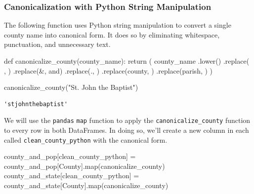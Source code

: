\documentclass[
  letterpaper,
  DIV=11,
  numbers=noendperiod]{scrreprt}
\newenvironment{Shaded}{\begin{snugshade}}{\end{snugshade}}
\newcommand{\BuiltInTok}[1]{\textcolor[rgb]{0.00,0.23,0.31}{#1}}
\newcommand{\ControlFlowTok}[1]{\textcolor[rgb]{0.00,0.23,0.31}{#1}}
\newcommand{\KeywordTok}[1]{\textcolor[rgb]{0.00,0.23,0.31}{#1}}
\newcommand{\NormalTok}[1]{\textcolor[rgb]{0.00,0.23,0.31}{#1}}
\newcommand{\OperatorTok}[1]{\textcolor[rgb]{0.37,0.37,0.37}{#1}}
\newcommand{\StringTok}[1]{\textcolor[rgb]{0.13,0.47,0.30}{#1}}
\begin{document}
\hypertarget{canonicalization-with-python-string-manipulation}{%
\subsubsection{Canonicalization with Python String
Manipulation}\label{canonicalization-with-python-string-manipulation}}

The following function uses Python string manipulation to convert a
single county name into canonical form. It does so by eliminating
whitespace, punctuation, and unnecessary text.

\begin{Shaded}
\begin{Highlighting}[]
\KeywordTok{def}\NormalTok{ canonicalize\_county(county\_name):}
    \ControlFlowTok{return}\NormalTok{ (}
\NormalTok{        county\_name}
\NormalTok{            .lower()}
\NormalTok{            .replace(}\StringTok{\textquotesingle{} \textquotesingle{}}\NormalTok{, }\StringTok{\textquotesingle{}\textquotesingle{}}\NormalTok{)}
\NormalTok{            .replace(}\StringTok{\textquotesingle{}\&\textquotesingle{}}\NormalTok{, }\StringTok{\textquotesingle{}and\textquotesingle{}}\NormalTok{)}
\NormalTok{            .replace(}\StringTok{\textquotesingle{}.\textquotesingle{}}\NormalTok{, }\StringTok{\textquotesingle{}\textquotesingle{}}\NormalTok{)}
\NormalTok{            .replace(}\StringTok{\textquotesingle{}county\textquotesingle{}}\NormalTok{, }\StringTok{\textquotesingle{}\textquotesingle{}}\NormalTok{)}
\NormalTok{            .replace(}\StringTok{\textquotesingle{}parish\textquotesingle{}}\NormalTok{, }\StringTok{\textquotesingle{}\textquotesingle{}}\NormalTok{)}
\NormalTok{    )}

\NormalTok{canonicalize\_county(}\StringTok{"St. John the Baptist"}\NormalTok{)}
\end{Highlighting}
\end{Shaded}

\begin{verbatim}
'stjohnthebaptist'
\end{verbatim}

We will use the \texttt{pandas} \texttt{map} function to apply the
\texttt{canonicalize\_county} function to every row in both DataFrames.
In doing so, we'll create a new column in each called
\texttt{clean\_county\_python} with the canonical form.

\begin{Shaded}
\begin{Highlighting}[]
\NormalTok{county\_and\_pop[}\StringTok{\textquotesingle{}clean\_county\_python\textquotesingle{}}\NormalTok{] }\OperatorTok{=}\NormalTok{ county\_and\_pop[}\StringTok{\textquotesingle{}County\textquotesingle{}}\NormalTok{].}\BuiltInTok{map}\NormalTok{(canonicalize\_county)}
\NormalTok{county\_and\_state[}\StringTok{\textquotesingle{}clean\_county\_python\textquotesingle{}}\NormalTok{] }\OperatorTok{=}\NormalTok{ county\_and\_state[}\StringTok{\textquotesingle{}County\textquotesingle{}}\NormalTok{].}\BuiltInTok{map}\NormalTok{(canonicalize\_county)}
\end{Highlighting}
\end{Shaded}
\end{document}
